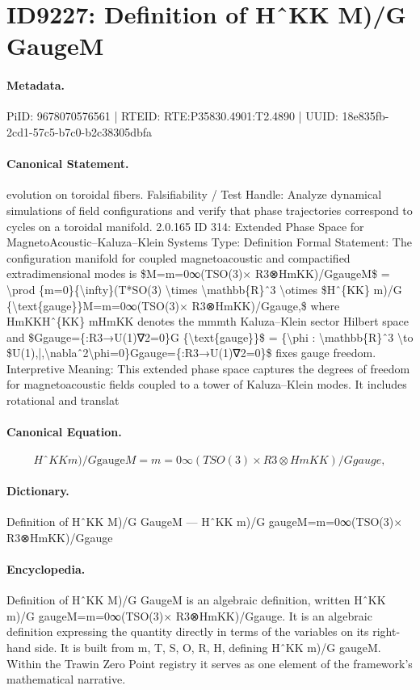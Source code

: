\section*{ID9227: Definition of HˆKK M)/G GaugeM}
\paragraph{Metadata.}
PiID: 9678070576561 | RTEID: RTE:P35830.4901:T2.4890 | UUID: 18e835fb-2cd1-57c5-b7c0-b2c38305dbfa

\paragraph{Canonical Statement.}
evolution on toroidal fibers. Falsifiability / Test Handle: Analyze dynamical simulations of field configurations and verify that phase trajectories correspond to cycles on a toroidal manifold. 2.0.165 ID 314: Extended Phase Space for MagnetoAcoustic–Kaluza–Klein Systems Type: Definition Formal Statement: The configuration manifold for coupled magnetoacoustic and compactified extradimensional modes is \$M=m=0∞(TSO(3)× R3⊗HmKK)/GgaugeM\$ = \textbackslash{}prod \{m=0\}\{\textbackslash{}infty\}(T*SO(3) \textbackslash{}times \textbackslash{}mathbb\{R\}ˆ3 \textbackslash{}otimes \$Hˆ\{KK\} m)/G \{\textbackslash{}text\{gauge\}\}M=m=0∞(TSO(3)× R3⊗HmKK)/Ggauge,\$ where HmKKHˆ\{KK\} mHmKK denotes the mmmth Kaluza–Klein sector Hilbert space and \$Ggauge=\{:R3→U(1)∇2=0\}G \{\textbackslash{}text\{gauge\}\}\$ = \{\textbackslash{}phi : \textbackslash{}mathbb\{R\}ˆ3 \textbackslash{}to \$U(1),|,\textbackslash{}nablaˆ2\textbackslash{}phi=0\}Ggauge=\{:R3→U(1)∇2=0\}\$ fixes gauge freedom. Interpretive Meaning: This extended phase space captures the degrees of freedom for magnetoacoustic fields coupled to a tower of Kaluza–Klein modes. It includes rotational and translat

\paragraph{Canonical Equation.}
\[
Hˆ{KK} m)/G {\text{gauge}}M=m=0∞(TSO(3)× R3⊗HmKK)/Ggauge,
\]

\paragraph{Dictionary.}
Definition of HˆKK M)/G GaugeM — HˆKK m)/G gaugeM=m=0∞(TSO(3)× R3⊗HmKK)/Ggauge

\paragraph{Encyclopedia.}
Definition of HˆKK M)/G GaugeM is an algebraic definition, written HˆKK m)/G gaugeM=m=0∞(TSO(3)× R3⊗HmKK)/Ggauge. It is an algebraic definition expressing the quantity directly in terms of the variables on its right-hand side. It is built from m, T, S, O, R, H, defining HˆKK m)/G gaugeM. Within the Trawin Zero Point registry it serves as one element of the framework's mathematical narrative.
